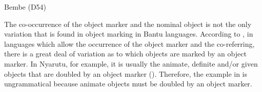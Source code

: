 \documentclass[output=paper]{langscibook}
\begin{document}
\ea\label{ex:ngunga:5}  Bembe (D54)    \citep[196]{Iorio2015} \\
    \z
\z

The co-occurrence of the object marker and the nominal object is not the only variation that is found in object marking in Bantu languages. According to \citet{vanderWal2015}, in languages which allow the occurrence of the object marker and the co-referring, there is a great deal of variation as to which objects are marked by an object marker. In Nyarutu, for example, it is usually the animate, definite and/or given objects that are doubled by an object marker (\citealt{vanderWal2015, vanderWal2016}). Therefore, the example in  is ungrammatical because animate objects must be doubled by an object marker. 

\ea\label{ex:ngunga:6}
\end{document}
